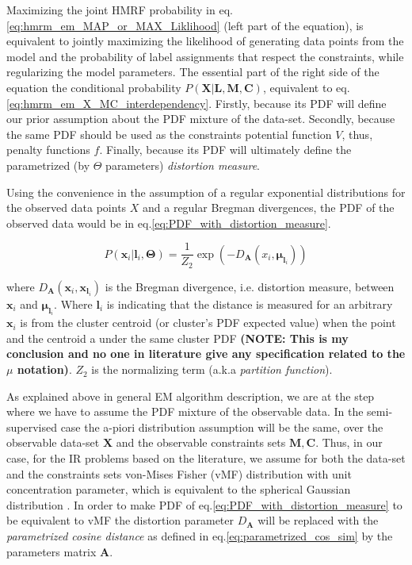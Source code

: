\documentclass[dvips,dvipdfm,pdftex]{llncs}
\begin{document}
Maximizing the joint HMRF probability in eq.\ref{eq:hmrm_em_MAP_or_MAX_Liklihood} (left part of the equation), is equivalent to jointly maximizing the likelihood of generating data points from the model and the probability of label assignments that respect the constraints, while regularizing the model parameters. The essential part of the right side of the equation the conditional probability $P(\mathbf{X}|\mathbf{L},\mathbf{M},\mathbf{C})$, equivalent to eq.\ref{eq:hmrm_em_X_MC_interdependency}. Firstly, because its PDF will define our prior assumption about the PDF mixture of the data-set. Secondly, because the same PDF should be used as the constraints potential function $V$, thus, penalty functions $f$. Finally, because its PDF will ultimately define the parametrized (by $\Theta$ parameters) \emph{distortion measure}.

Using the convenience in the assumption of a regular exponential distributions for the observed data points $X$ and a regular Bregman divergences, the PDF of the observed data would be in eq.\ref{eq:PDF_with_distortion_measure}.

\begin{equation}
	P(\mathbf{x}_{i}|\mathbf{l}_{i},\mathbf{\Theta})=\frac{1}{Z_{2}}\exp(-D_{\mathbf{A}}(x_{i},\mathbf{\mu}_{\mathbf{l}_{i}}))
\label{eq:PDF_with_distortion_measure}
\end{equation}

where $D_{\mathbf{A}}(\mathbf{x}_{i} , \mathbf{x}_{\mathbf{l}_{i}})$ is the Bregman divergence, i.e. distortion measure, between $\mathbf{x}_i$ and $\mathbf{\mu}_{\mathbf{l}_{i}}$. Where $\mathbf{l}_i$ is indicating that the distance is measured for an arbitrary $\mathbf{x}_{i}$ is from the cluster centroid (or cluster's PDF expected value) when the point and the centroid a under the same cluster PDF \textbf{(NOTE: This is my conclusion and no one in literature give any specification related to the $\mu$ notation)}. $Z_{2}$ is the normalizing term (a.k.a \emph{partition function}).

As explained above in general EM algorithm description, we are at the step where we have to assume the PDF mixture of the observable data. In the semi-supervised case the a-piori distribution assumption will be the same, over the observable data-set $\mathbf{X}$ and the observable constraints sets $\mathbf{M,C}$. Thus, in our case, for the IR problems based on the literature, we assume for both the data-set and the constraints sets von-Mises Fisher (vMF) distribution with unit concentration parameter, which is equivalent to the spherical Gaussian distribution \cite{basu2004probabilistic,chapelle2006semi_hmrf_kmeans}. In order to make PDF of eq.\ref{eq:PDF_with_distortion_measure} to be equivalent to vMF the distortion parameter $D_{\mathbf{A}}$ will be replaced with the \emph{parametrized cosine distance} as defined in eq.\ref{eq:parametrized_cos_sim} by the parameters matrix $\mathbf{A}$.
\end{document}
